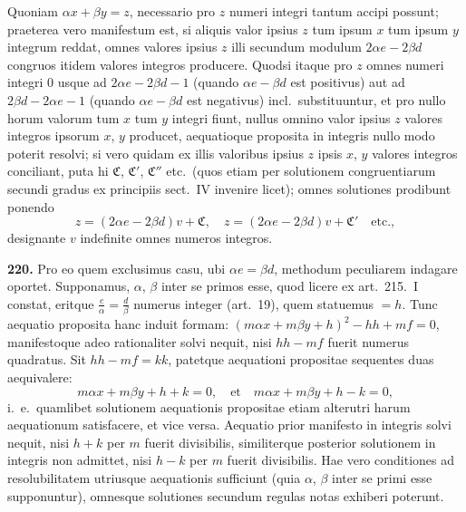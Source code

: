 \documentclass[12pt,a4paper]{article}
\theoremstyle{plain}
\theoremstyle{definition}
\theoremstyle{remark}
\begin{document}
Quoniam $\alpha x+\beta y=z$, necessario pro $z$ numeri integri tantum accipi possunt; praeterea vero manifestum est, si aliquis valor ipsius $z$ tum ipsum $x$ tum ipsum $y$ integrum reddat, omnes valores ipsius $z$ illi secundum modulum $2\alpha e-2\beta d$ congruos itidem valores integros producere. Quodsi itaque pro $z$ omnes numeri integri $0$ usque ad $2\alpha e-2\beta d-1$ (quando $\alpha e-\beta d$ est positivus) aut ad $2\beta d-2\alpha e-1$ (quando $\alpha e-\beta d$ est negativus) incl.\ substituuntur, et pro nullo horum valorum tum $x$ tum $y$ integri fiunt, nullus omnino valor ipsius $z$ valores integros ipsorum $x$, $y$ producet, aequatioque proposita in integris nullo modo poterit resolvi; si vero quidam ex illis valoribus ipsius $z$ ipsis $x$, $y$ valores integros conciliant, puta hi $\mathfrak{C}$, $\mathfrak{C}'$, $\mathfrak{C}''$ etc.\ (quos etiam per solutionem congruentiarum secundi gradus ex principiis sect.\ IV invenire licet); omnes solutiones prodibunt ponendo
\[
z=(2\alpha e-2\beta d)v+\mathfrak{C},\quad z=(2\alpha e-2\beta d)v+\mathfrak{C}'\quad\text{etc.},
\]
designante $v$ indefinite omnes numeros integros.

\textbf{220.}
Pro eo quem exclusimus casu, ubi $\alpha e=\beta d$, methodum peculiarem indagare oportet. Supponamus, $\alpha$, $\beta$ inter se primos esse, quod licere ex art.\ 215.\ I constat, eritque $\frac{e}{\alpha}=\frac{d}{\beta}$ numerus integer (art.\ 19), quem statuemus $=h$. Tunc aequatio proposita hanc induit formam: $(m\alpha x+m\beta y+h)^2-hh+mf=0$, manifestoque adeo rationaliter solvi nequit, nisi $hh-mf$ fuerit numerus quadratus. Sit $hh-mf=kk$, patetque aequationi propositae sequentes duas aequivalere:
\[
m\alpha x+m\beta y+h+k=0,\quad\text{et}\quad m\alpha x+m\beta y+h-k=0,
\]
i.\ e.\ quamlibet solutionem aequationis propositae etiam alterutri harum aequationum satisfacere, et vice versa. Aequatio prior manifesto in integris solvi nequit, nisi $h+k$ per $m$ fuerit divisibilis, similiterque posterior solutionem in integris non admittet, nisi $h-k$ per $m$ fuerit divisibilis. Hae vero conditiones ad resolubilitatem utriusque aequationis sufficiunt (quia $\alpha$, $\beta$ inter se primi esse supponuntur), omnesque solutiones secundum regulas notas exhiberi poterunt.
\end{document}
